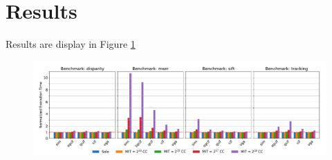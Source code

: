 \section{Results}
    Results are display in Figure \ref{fig:cup-brainfreeze-interference-results}
    \begin{figure}
        \centering
        \includegraphics[scale=0.425]{images/cpu-brainfreeze-interference.pdf}
        \caption{}
        \label{fig:cup-brainfreeze-interference-results}
    \end{figure}
